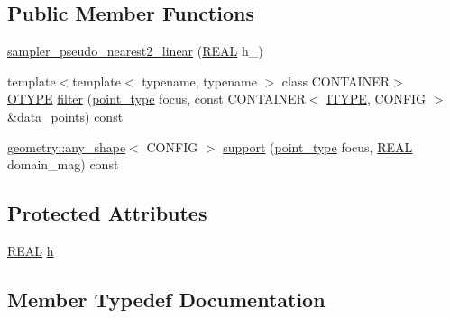 \subsection*{Public Member Functions}
\begin{DoxyCompactItemize}
\item 
\hyperlink{classmui_1_1sampler__pseudo__nearest2__linear_a54b5ff9195ce02534fa49b26d9a7c997}{sampler\+\_\+pseudo\+\_\+nearest2\+\_\+linear} (\hyperlink{classmui_1_1sampler__pseudo__nearest2__linear_aa35e86c6cf0ff62396daf5a94b6d931e}{R\+E\+AL} h\+\_\+)
\item 
{\footnotesize template$<$template$<$ typename, typename $>$ class C\+O\+N\+T\+A\+I\+N\+ER$>$ }\\\hyperlink{classmui_1_1sampler__pseudo__nearest2__linear_a3c1ae43f20045121e8c84d1f7116cf67}{O\+T\+Y\+PE} \hyperlink{classmui_1_1sampler__pseudo__nearest2__linear_adfcf81c81b9f4720328cb3d0f1de5060}{filter} (\hyperlink{classmui_1_1sampler__pseudo__nearest2__linear_ab60b56e487c5be134d5efcbf03f7621f}{point\+\_\+type} focus, const C\+O\+N\+T\+A\+I\+N\+ER$<$ \hyperlink{classmui_1_1sampler__pseudo__nearest2__linear_a1ab1a956844436db5763df87746f4090}{I\+T\+Y\+PE}, C\+O\+N\+F\+IG $>$ \&data\+\_\+points) const
\item 
\hyperlink{classmui_1_1geometry_1_1any__shape}{geometry\+::any\+\_\+shape}$<$ C\+O\+N\+F\+IG $>$ \hyperlink{classmui_1_1sampler__pseudo__nearest2__linear_a11f180774cc229847171aae2927f5469}{support} (\hyperlink{classmui_1_1sampler__pseudo__nearest2__linear_ab60b56e487c5be134d5efcbf03f7621f}{point\+\_\+type} focus, \hyperlink{classmui_1_1sampler__pseudo__nearest2__linear_aa35e86c6cf0ff62396daf5a94b6d931e}{R\+E\+AL} domain\+\_\+mag) const
\end{DoxyCompactItemize}
\subsection*{Protected Attributes}
\begin{DoxyCompactItemize}
\item 
\hyperlink{classmui_1_1sampler__pseudo__nearest2__linear_aa35e86c6cf0ff62396daf5a94b6d931e}{R\+E\+AL} \hyperlink{classmui_1_1sampler__pseudo__nearest2__linear_a47b63920b15a36ce8d716f89e72947ff}{h}
\end{DoxyCompactItemize}


\subsection{Member Typedef Documentation}
\mbox{\label{classmui_1_1sampler__pseudo__nearest2__linear_a0c56f2dcb173523bfdb33fc9a271c767}} 
